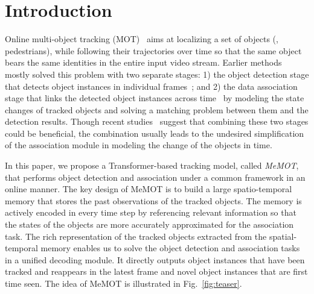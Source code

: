 \section{Introduction}
\label{sec:intro}

Online multi-object tracking (MOT)~\cite{wojke2017simple,feichtenhofer2017detect,bergmann2019tracking,zhang2020fair} aims at localizing a set of objects (\eg, pedestrians), while following their trajectories over time so that the same object bears the same identities in the entire input video stream. 
Earlier methods mostly solved this problem with two separate stages:
1) the object detection stage that detects object instances in individual frames~\cite{felzenszwalb2009object,ren2015faster,liu2016ssd,zhou2019objects,ge2021yolox}; and 2) the data association stage that links the detected object instances across time~\cite{braso2020learning,zhang2020fair} by modeling the state changes of tracked objects and solving a matching problem between them and the detection results.
Though recent studies~\cite{meinhardt2021trackformer,zeng2021motr} suggest that combining these two stages could be beneficial, the combination usually leads to the undesired simplification of the association module in modeling the change of the objects in time.  

In this paper, we propose a Transformer-based tracking model, called \emph{MeMOT}, that performs object detection and association under a common framework in an online manner. 
The key design of MeMOT is to build a large spatio-temporal memory that stores the past observations of the tracked objects. The memory is actively encoded in every time step by referencing relevant information so that the states of the objects are more accurately approximated for the association task.
The rich representation of the tracked objects extracted from the spatial-temporal memory enables us to solve the object detection and association tasks in a unified decoding module. It directly outputs object instances that have been tracked and reappears in the latest frame and novel object instances that are first time seen.
The idea of MeMOT is illustrated in Fig.~\ref{fig:teaser}. 

